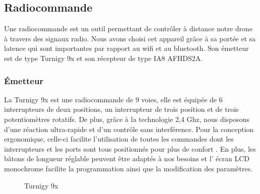 \subsection {Radiocommande}
Une radiocommande est un outil permettant de contrôler à distance notre drone à travers des signaux radio. Nous avons choisi cet appareil grâce à sa portée et sa latence qui sont importantes par rapport au wifi et au bluetooth. Son émetteur est de type Turnigy 9x et son récepteur de type IA8 AFHDS2A.

\subsubsection{Émetteur} 
La Turnigy 9x est une radiocommande de 9 voies, elle est équipée de 6 interrupteurs de deux positions, un interrupteur de trois position et de trois potentiomètres rotatifs.
De plus, grâce à la technologie 2,4 Ghz, nous disposons d'une réaction ultra-rapide et d'un contrôle sans interférence. Pour la
conception ergonomique, celle-ci facilite l'utilisation de toutes les commandes dont les interrupteurs et les ports sont tous positionnés pour plus de confort \cite{Hobbyking}. En plus, les bâtons de longueur réglable peuvent être adaptés à nos besoins et l' écran LCD monochrome facilite la programmation ainsi que la modification des paramètres. 

\begin{figure} [H]
	\begin{center}
		\centering
		\vskip 1cm
	\end{center}
	\caption{Turnigy 9x}
\end{figure}
